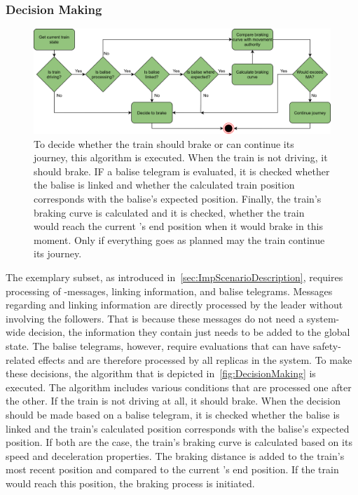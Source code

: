 \subsubsection{Decision Making}


\begin{figure}[!hb]
	\centering
	\includegraphics[width=0.75\linewidth]{images/DecisionMaking}
	\caption{To decide whether the train should brake or can continue its journey, this algorithm is executed. When the train is not driving, it should brake. IF a balise telegram is evaluated, it is checked whether the balise is linked and whether the calculated train position corresponds with the balise's expected position. Finally, the train's braking curve is calculated and it is checked, whether the train would reach the current 's end position when it would brake in this moment. Only if everything goes as planned may the train continue its journey.}
	\label{fig:DecisionMaking}
\end{figure}

The exemplary  subset, as introduced in~\autoref{sec:ImpScenarioDescription}, requires processing of -messages, linking information, and balise telegrams.
Messages regarding  and linking information are directly processed by the leader without involving the followers.
That is because these messages do not need a system-wide decision, the information they contain just needs to be added to the global state.
The balise telegrams, however, require evaluations that can have safety-related effects and are therefore processed by all replicas in the system.
To make these decisions, the algorithm that is depicted in~\autoref{fig:DecisionMaking} is executed.
The algorithm includes various conditions that are processed one after the other.
If the train is not driving at all, it should brake.
When the decision should be made based on a balise telegram, it is checked whether the balise is linked and the train's calculated position corresponds with the balise's expected position.
If both are the case, the train's braking curve is calculated based on its speed and deceleration properties.
The braking distance is added to the train's most recent position and compared to the current 's end position.
If the train would reach this position, the braking process is initiated.

